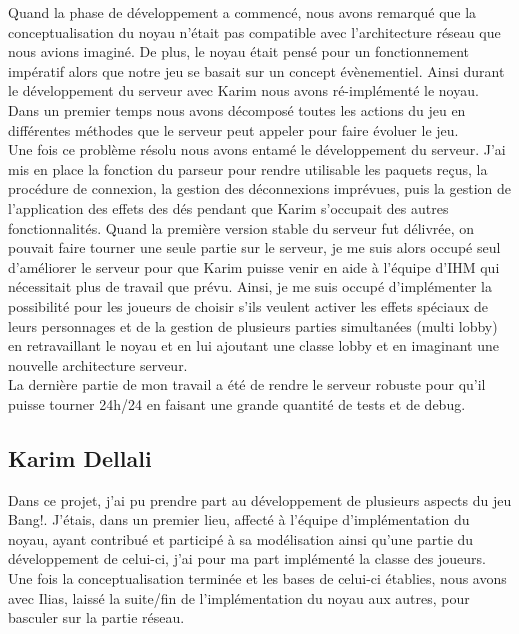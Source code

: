 \documentclass[a4paper,11pt]{article}
\begin{document}
\newpage


    Quand la phase de développement a commencé, nous avons remarqué que la conceptualisation du noyau n’était pas compatible avec l'architecture réseau que nous avions imaginé. De plus, le noyau était pensé pour un fonctionnement impératif alors que notre jeu se basait sur un concept évènementiel. Ainsi durant le développement du serveur avec Karim nous avons ré-implémenté le noyau. Dans un premier temps nous avons décomposé toutes les actions du jeu en différentes méthodes que le serveur peut appeler pour faire évoluer le jeu.  \\

    Une fois ce problème résolu nous avons entamé le développement du serveur. J’ai mis en place la fonction du parseur pour rendre utilisable les paquets reçus, la procédure de connexion, la gestion des déconnexions imprévues, puis la gestion de l’application des effets des dés pendant que Karim s’occupait des autres fonctionnalités. Quand la première version stable du serveur fut délivrée, on pouvait faire tourner une seule partie sur le serveur, je me suis alors occupé seul d’améliorer le serveur pour que Karim puisse venir en aide à l’équipe d’IHM qui nécessitait plus de travail que prévu. Ainsi, je me suis occupé d'implémenter la possibilité pour les joueurs de choisir s'ils veulent activer les effets spéciaux de leurs personnages et de la gestion de plusieurs parties simultanées (multi lobby) en retravaillant le noyau et en lui ajoutant une classe lobby et en imaginant une nouvelle architecture serveur. \\

    La dernière partie de mon travail a été de rendre le serveur robuste pour qu’il puisse tourner 24h/24 en faisant une grande quantité de tests et de debug.

\subsection{Karim Dellali}

	Dans ce projet, j’ai pu prendre part au développement de plusieurs aspects du jeu Bang!. J’étais, dans un premier lieu, affecté à l’équipe d’implémentation du noyau, ayant contribué et participé à sa modélisation ainsi qu’une partie du développement de celui-ci, j’ai pour ma part implémenté la classe des joueurs. Une fois la conceptualisation terminée et  les bases de celui-ci établies, nous avons avec Ilias, laissé la suite/fin de l’implémentation du noyau aux autres, pour basculer sur la partie réseau.  \\
\end{document}
